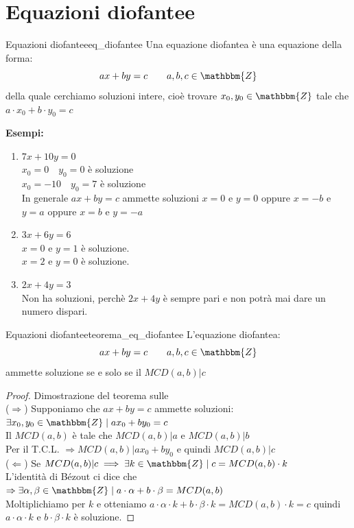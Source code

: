 \documentclass[12pt, letterpaper]{report}
\newcounter{theorem}
\newcounter{definition}
\newcommand{\namerefl}[1]{%
	\bgroup
	\let\nmu\MakeLowercase
	\nameref{#1}\egroup}
\newcommand{\nmu}{}
\begin{document}
		\chapter{Equazioni diofantee}
			\begin{definition}{\nmu Equazioni diofantee}{eq_diofantee}
				Una equazione diofantea è una equazione della forma:
				\[
				ax + by = c \quad \quad a,b,c \in \mathbbm{Z}
				\]
				della quale cerchiamo soluzioni intere, cioè trovare $x_0, y_0  \in \mathbbm{Z}$ tale che $a \cdot x_0 + b \cdot y_0 = c$
			\end{definition}
			\textbf{Esempi:}
			\begin{enumerate}
				\item $7x + 10y = 0$ \\
				$x_0 = 0 \quad y_0 = 0$ è soluzione \\
				$x_0 = -10 \quad y_0 = 7$ è soluzione \\
				In generale $ax + by = c$ ammette soluzioni $x=0$ e $y=0$ oppure $x=-b$ e $y=a$ oppure $x=b$ e $y=-a$
				\item $3x + 6y = 6$ \\
				$x=0$ e $y=1$ è soluzione. \\
				$x=2$ e $y=0$ è soluzione. \\
				\item $2x + 4y = 3$ \\
				Non ha soluzioni, perchè $2x + 4y$ è sempre pari e non potrà mai dare un numero dispari.
			\end{enumerate}
			\begin{theorem}{\nmu Equazioni diofantee}{teorema_eq_diofantee}
							L'equazione diofantea:
				\[
				ax + by = c \quad \quad a,b,c \in \mathbbm{Z}
				\]
				ammette soluzione se e solo se il $MCD(a,b) | c$
				\begin{proof}{Dimostrazione del teorema sulle \namerefl{th:teorema_eq_diofantee}}\quad \\
					($\Longrightarrow$) Supponiamo che $ax + by = c$ ammette soluzioni: \\
					$\exists x_0, y_0 \in \mathbbm{Z} \mid ax_0 + by_0 = c$ \\
					Il $MCD(a,b)$ è tale che $MCD(a,b) | a$ e $MCD(a,b) | b$ \\
					Per il T.C.L. $\Rightarrow MCD(a,b) | ax_0 + by_0$ e quindi $MCD(a,b) | c$ \\
					($\Longleftarrow$) Se $MCD(a,b) | c \implies \exists k \in \mathbbm{Z} \mid c = MCD(a,b) \cdot k$ \\
					L'identità di Bézout ci dice che $\Rightarrow \exists \alpha, \beta \in \mathbbm{Z} \mid a\cdot \alpha + b \cdot \beta = MCD(a,b)$\\
					Moltiplichiamo per $k$ e otteniamo $a \cdot \alpha \cdot k + b \cdot \beta \cdot k = MCD(a,b) \cdot k = c$ quindi $a \cdot \alpha \cdot k$ e $b \cdot \beta \cdot k$ è soluzione.
				\end{proof}
			\end{theorem}
\end{document}
